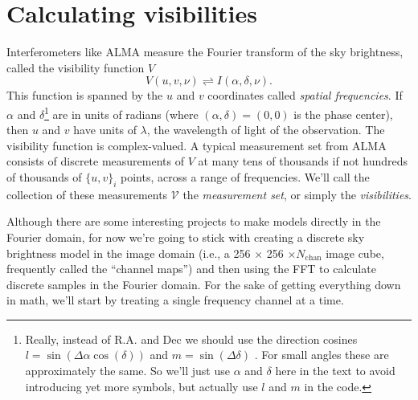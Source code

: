 \documentclass[modern]{aastex62}
\newcommand{\vd}{\boldsymbol{\mathcal{V}}} %
\begin{document}
\section{Calculating visibilities}
Interferometers like ALMA measure the Fourier transform of the sky brightness, called the visibility function $V$
\begin{equation}
  V(u, v, \nu) \rightleftharpoons I(\alpha, \delta, \nu).
\end{equation}
This function is spanned by the $u$ and $v$ coordinates called \emph{spatial frequencies}. If $\alpha$ and $\delta$\footnote{Really, instead of R.A. and Dec we should use the direction cosines $l = \sin(\Delta \alpha \cos(\delta))$ and $m = \sin(\Delta \delta)$ \citep[see ch 3.1;][]{thompson17}. For small angles these are approximately the same. So we'll just use $\alpha$ and $\delta$ here in the text to avoid introducing yet more symbols, but actually use $l$ and $m$ in the code.} are in units of radians (where $(\alpha, \delta)=(0,0)$  is the phase center), then $u$ and $v$ have units of $\lambda$, the wavelength of light of the observation. The visibility function is complex-valued. A typical measurement set from ALMA consists of discrete measurements of $V$ at many tens of thousands if not hundreds of thousands of $\{ u, v\}_i$ points, across a range of frequencies. We'll call the collection of these measurements $\vd$ the \emph{measurement set}, or simply the \emph{visibilities}.

Although there are some interesting projects to make models directly in the Fourier domain, for now we're going to stick with creating a discrete sky brightness model in the image domain (i.e., a 256 $\times$ 256 $\times N_\mathrm{chan}$ image cube, frequently called the ``channel maps'') and then using the FFT to calculate discrete samples in the Fourier domain. For the sake of getting everything down in math, we'll start by treating a single frequency channel at a time. 
\end{document}
